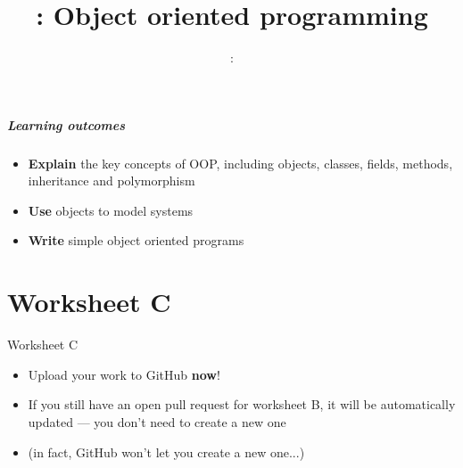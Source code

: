 \usepackage{../../beamerthemeFalmouthGamesAcademy}
\usepackage{multimedia}
\graphicspath{ {../../} }

\usepackage[utf8]{inputenc}

\lstset{language=Python
}

\usepackage[normalem]{ulem}
\usepackage{wasysym}

\usepackage{pdfpages}

\usetikzlibrary{arrows,automata}




\title{\sessionnumber: Object oriented programming}
\subtitle{\modulecode: \moduletitle}

\frame{\titlepage} 

\begin{frame}
	\frametitle{Learning outcomes}
	\begin{itemize}
    \item\textbf{Explain} the key concepts of OOP, including objects, classes, fields, methods, inheritance and polymorphism
    \item\textbf{Use} objects to model systems
    \item\textbf{Write} simple object oriented programs
	\end{itemize}
\end{frame}




\part{Worksheet C}
\frame{\partpage}

\begin{frame}{Worksheet C}
	\begin{itemize}
		\item Upload your work to GitHub \textbf{now}!
		\item If you still have an open pull request for worksheet B,
			it will be automatically updated --- you don't need to create a new one
		\item (in fact, GitHub won't let you create a new one...)
	\end{itemize}
\end{frame}


